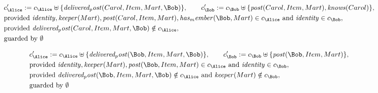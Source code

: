 \begin{align*}
&
c'_
{
\Alice
}
 := 
c_
{
\Alice
}
 \uplus 
\{
\mathit{
delivered_post
}
(
Carol
,
Item
,
Mart
,
\Bob
)
\}
, \qquad 
c'_
{
\Bob
}
 := 
c_
{
\Bob
}
 \uplus 
\{
\mathit{
post
}
(
Carol
,
Item
,
Mart
)
,
\mathit{
knows
}
(
Carol
)
\}
,\\
&
\text{provided } 
\mathit{
identity
}
,
\mathit{
keeper
}
(
Mart
)
,
\mathit{
post
}
(
Carol
,
Item
,
Mart
)
,
\mathit{
has_member
}
(
\Bob
,
Mart
)
 \in c_
{
\Alice
}
 \text{ and } 
\mathit{
identity
}
 \in c_
{
\Bob
}
,\\
&
\text{provided } 
\mathit{
delivered_post
}
(
Carol
,
Item
,
Mart
,
\Bob
)
 \notin c_
{
\Alice
}
,\\
&
\text{guarded by } \emptyset
\end{align*}

\begin{align*}
&
c'_
{
\Alice
}
 := 
c_
{
\Alice
}
 \uplus 
\{
\mathit{
delivered_post
}
(
\Bob
,
Item
,
Mart
,
\Bob
)
\}
, \qquad 
c'_
{
\Bob
}
 := 
c_
{
\Bob
}
 \uplus 
\{
\mathit{
post
}
(
\Bob
,
Item
,
Mart
)
\}
,\\
&
\text{provided } 
\mathit{
identity
}
,
\mathit{
keeper
}
(
Mart
)
,
\mathit{
post
}
(
\Bob
,
Item
,
Mart
)
 \in c_
{
\Alice
}
 \text{ and } 
\mathit{
identity
}
 \in c_
{
\Bob
}
,\\
&
\text{provided } 
\mathit{
delivered_post
}
(
\Bob
,
Item
,
Mart
,
\Bob
)
 \notin c_
{
\Alice
}
 \text{ and } 
\mathit{
keeper
}
(
Mart
)
 \notin c_
{
\Bob
}
,\\
&
\text{guarded by } \emptyset
\end{align*}

